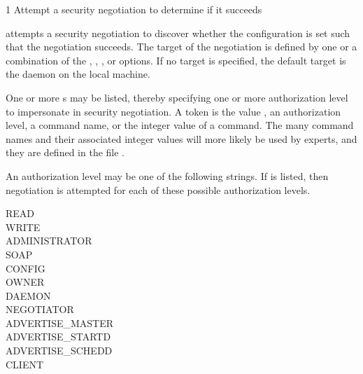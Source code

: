 \begin{ManPage}{\label{man-condor-ping}}{1}
{Attempt a security negotiation to determine if it succeeds}

\Synopsis {}
\ToolArgsBase


\Description
{} attempts a security negotiation to discover whether the
configuration is set such that the negotiation succeeds.
The target of the negotiation is defined by one or a combination of 
the , , , or  options.
If no target is specified,
the default target is the  daemon on the local machine.

One or more s may be listed,
thereby specifying one or more authorization level to impersonate in
security negotiation.
A token is the value , an authorization level,
a command name, or the integer value of a command.
The many command names and their associated integer values will more
likely be used by experts,
and they are defined in the file . 

An authorization level may be one of the following strings.
If  is listed, 
then negotiation is attempted for each of these possible authorization levels.
\begin{description}
\item[READ]
\item[WRITE]
\item[ADMINISTRATOR]
\item[SOAP]
\item[CONFIG]
\item[OWNER]
\item[DAEMON]
\item[NEGOTIATOR]
\item[ADVERTISE\_MASTER]
\item[ADVERTISE\_STARTD]
\item[ADVERTISE\_SCHEDD]
\item[CLIENT]
\end{description}


\end{ManPage}

